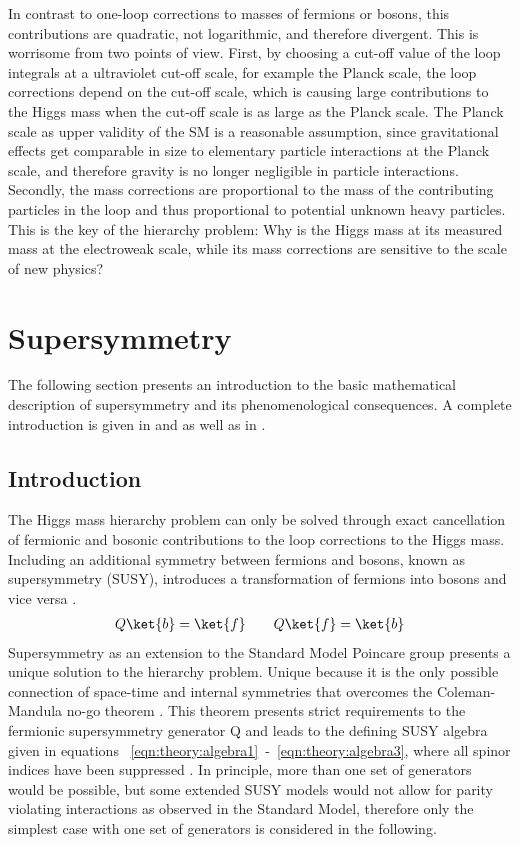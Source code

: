 In contrast to one-loop corrections to masses of fermions or bosons, this contributions are quadratic, not logarithmic, and therefore divergent.  
This is worrisome from two points of view.
First, by choosing a cut-off value of the loop integrals at a ultraviolet cut-off scale, for example the Planck scale, the loop corrections depend on the cut-off scale, which is causing large contributions to the Higgs mass when the cut-off scale is as large as the Planck scale. The Planck scale as upper validity of the SM is a reasonable assumption, since gravitational effects get comparable in size to elementary particle interactions at the Planck scale, and therefore gravity is no longer negligible in particle interactions.
Secondly, the mass corrections are proportional to the mass of the contributing particles in the loop and thus proportional to potential unknown heavy particles. This is the key of the hierarchy problem: Why is the Higgs mass at its measured mass at the electroweak scale, while its mass corrections are sensitive to the scale of new physics?




\section{Supersymmetry}
The following section presents an introduction to the basic mathematical description of supersymmetry and its phenomenological consequences. A complete introduction is given in \cite{SUSYPrimer} and \cite{Binetruy2006} as well as in \cite{BSMSkriptCsaki}. 

\subsection{Introduction}
The Higgs mass hierarchy problem can only be solved through exact cancellation of fermionic and bosonic contributions to the loop corrections to the Higgs mass. Including an additional symmetry between fermions and bosons, known as supersymmetry (SUSY), introduces a transformation of fermions into bosons and vice versa \cite{SUSYPrimer}.
\begin{align}
\label{eqn:theory:susydefinition}
Q\ket{b} = \ket{f} \qquad
Q\ket{f} = \ket{b}
\end{align}
Supersymmetry as an extension to the Standard Model Poincare group presents a unique solution to the hierarchy problem. Unique because it is the only possible connection of space-time and internal symmetries that overcomes the Coleman-Mandula no-go theorem \cite{BSMSkriptCsaki}. This theorem presents strict requirements to the fermionic supersymmetry generator Q and leads to the defining SUSY algebra given in equations ~\eqref{eqn:theory:algebra1}~-~\eqref{eqn:theory:algebra3}, where all spinor indices have been suppressed \cite{SUSYPrimer}.  In principle, more than one set of generators would be possible, but some extended SUSY models would not allow for parity violating interactions as observed in the Standard Model, therefore only the simplest case with one set of generators is considered in the following.

